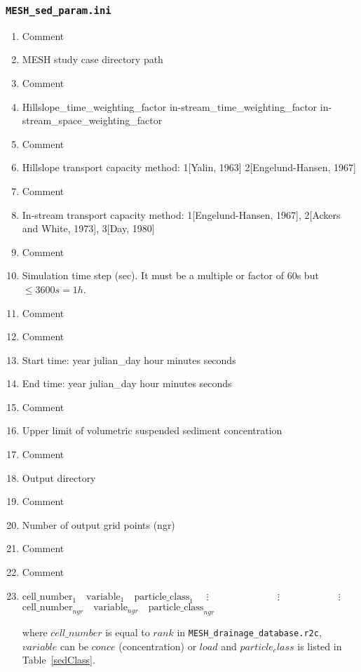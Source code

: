 \documentclass[12pt, letterpaper]{article}
\begin{document}
\subsubsection{\texttt{MESH\_sed\_param.ini}}
{\tiny
\begin{enumerate}[label=Line \arabic*]\itemsep0em 
\item Comment
\item MESH study case directory path
\item Comment
\item Hillslope\_time\_weighting\_factor	in-stream\_time\_weighting\_factor	in-stream\_space\_weighting\_factor
\item Comment
\item Hillslope transport capacity method: 1[Yalin, 1963]\cite{yalin1963expression} 2[Engelund-Hansen, 1967]\cite{engelund1967monograph}
\item Comment
\item In-stream transport capacity method: 1[Engelund-Hansen, 1967]\cite{engelund1967monograph}, 2[Ackers and White, 1973]\cite{ackers1973sediment}, 3[Day, 1980]\cite{}
\item Comment
\item Simulation time step (sec). It must be a multiple or factor of 60s but $\le 3600 s = 1 h$.
\item Comment
\item Comment
\item Start time: year julian\_day hour minutes seconds
\item End time: year julian\_day hour minutes seconds
\item Comment
\item Upper limit of volumetric suspended sediment concentration
\item Comment
\item Output directory
\item Comment
\item Number of output grid points (ngr)
\item Comment
\item Comment
\item 
\parbox{\textwidth}{
$\text{cell\_number}_1 \quad \text{variable}_1 \quad \text{particle\_class}_1$ \newline
$\quad \vdots \quad\quad\quad\quad\quad\quad\quad  \vdots \quad\quad\quad\quad\quad\quad \vdots$ \newline
$\text{cell\_number}_{ngr} \quad \text{variable}_{ngr} \quad \text{particle\_class}_{ngr} $

}
where $cell\_number$ is equal to $rank$ in \texttt{MESH\_drainage\_database.r2c}, $variable$ can be $conce$ (concentration) or $load$ and $particle_class$ is listed in Table~\ref{sedClass}.
\end{enumerate}
}
\end{document}
